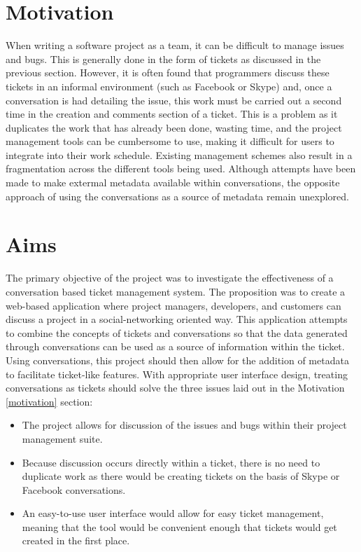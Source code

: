 \documentclass[a4paper]{l3proj}
\begin{document}
\section{Motivation}
\label{motivation}

When writing a software project as a team, it can be difficult to manage issues and bugs. This is generally done in the form of tickets as discussed in the previous section. However, it is often found that programmers discuss these tickets in an informal environment (such as Facebook or Skype) and, once a conversation is had detailing the issue, this work must be carried out a second time in the creation and comments section of a ticket. This is a problem as it duplicates the work that has already been done, wasting time, and the project management tools can be cumbersome to use, making it difficult for users to integrate into their work schedule. Existing management schemes also result in a fragmentation across the different tools being used. Although attempts have been made to make extermal metadata available within conversations, the opposite approach of using the conversations as a source of metadata remain unexplored.

\section{Aims}
\label{aims}

The primary objective of the project was to investigate the effectiveness of a conversation based ticket management system. The proposition was to create a web-based application where project managers, developers, and customers can discuss a project in a social-networking oriented way. This application attempts to combine the concepts of tickets and conversations so that the data generated through conversations can be used as a source of information within the ticket. Using conversations, this project should then allow for the addition of metadata to facilitate ticket-like features. With appropriate user interface design, treating conversations as tickets should solve the three issues laid out in the Motivation \autoref{motivation} section:
\begin{itemize}
\item The project allows for discussion of the issues and bugs within their project management suite.
\item Because discussion occurs directly within a ticket, there is no need to duplicate work as there would be creating tickets on the basis of Skype or Facebook conversations.
\item An easy-to-use user interface would allow for easy ticket management, meaning that the tool would be convenient enough that tickets would get created in the first place.
\end{itemize}
\end{document}
